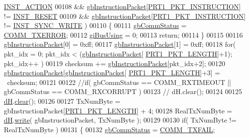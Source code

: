 \begin{DoxyCode}
      \hyperlink{dynamixel_8h_adea21b73305aa7a5b3317e299c616853}{INST\_ACTION}
00108         && \hyperlink{classdynamixel_afd94dcf01b8e96298727776e222de722}{gbInstructionPacket}[\hyperlink{dynamixel_8h_a3da1d083c018994fb0c859f4e06e1f78}{PRT1\_PKT\_INSTRUCTION}] != 
      \hyperlink{dynamixel_8h_ad670526ca941302efb4a0d00e7dd43c0}{INST\_RESET}
00109         && \hyperlink{classdynamixel_afd94dcf01b8e96298727776e222de722}{gbInstructionPacket}[\hyperlink{dynamixel_8h_a3da1d083c018994fb0c859f4e06e1f78}{PRT1\_PKT\_INSTRUCTION}] != 
      \hyperlink{dynamixel_8h_aeaa4b61ee11d45bd1a0cb932d7abaf77}{INST\_SYNC\_WRITE} )
00110     \{
00111         \hyperlink{classdynamixel_a5b603f6bed7ccc595f1f50bd6a6ebbfc}{gbCommStatus} = \hyperlink{dynamixel_8h_a1bd7c7b30db4f56dc80cef65ad38afff}{COMM\_TXERROR};
00112         \hyperlink{classdynamixel_ad10e0e49f5fef04bf789a89c14cc470a}{giBusUsing} = 0;
00113         \textcolor{keywordflow}{return};
00114     \}
00115     
00116     \hyperlink{classdynamixel_afd94dcf01b8e96298727776e222de722}{gbInstructionPacket}[0] = 0xff;
00117     \hyperlink{classdynamixel_afd94dcf01b8e96298727776e222de722}{gbInstructionPacket}[1] = 0xff;
00118     \textcolor{keywordflow}{for}( pkt\_idx = 0; pkt\_idx < (\hyperlink{classdynamixel_afd94dcf01b8e96298727776e222de722}{gbInstructionPacket}[
      \hyperlink{dynamixel_8h_ab24601f91d0364e4b62edad3c2a0a5c4}{PRT1\_PKT\_LENGTH}]+1); pkt\_idx++ )
00119         checksum += \hyperlink{classdynamixel_afd94dcf01b8e96298727776e222de722}{gbInstructionPacket}[pkt\_idx+2];
00120     \hyperlink{classdynamixel_afd94dcf01b8e96298727776e222de722}{gbInstructionPacket}[\hyperlink{classdynamixel_afd94dcf01b8e96298727776e222de722}{gbInstructionPacket}[
      \hyperlink{dynamixel_8h_ab24601f91d0364e4b62edad3c2a0a5c4}{PRT1\_PKT\_LENGTH}]+3] = ~checksum;
00121     
00122     \textcolor{comment}{//if( gbCommStatus == COMM\_RXTIMEOUT || gbCommStatus == COMM\_RXCORRUPT )}
00123     \textcolor{comment}{//  dH.clear();}
00124 
00125     \hyperlink{classdynamixel_ae003cc90ada6d7b70eaa4ea9d42d4deb}{dH}.\hyperlink{classdxl__hal_a004eedde5af69219d7288ec8ea97c89f}{clear}();
00126 
00127     TxNumByte = gbInstructionPacket[\hyperlink{dynamixel_8h_ab24601f91d0364e4b62edad3c2a0a5c4}{PRT1\_PKT\_LENGTH}] + 4;
00128     RealTxNumByte = \hyperlink{classdynamixel_ae003cc90ada6d7b70eaa4ea9d42d4deb}{dH}.\hyperlink{classdxl__hal_a90106970438fb0ab65852730a1c0776a}{write}( gbInstructionPacket, TxNumByte );
00129 
00130     \textcolor{keywordflow}{if}( TxNumByte != RealTxNumByte )
00131     \{
00132         \hyperlink{classdynamixel_a5b603f6bed7ccc595f1f50bd6a6ebbfc}{gbCommStatus} = \hyperlink{dynamixel_8h_af88390c8be18c4079e65fd07b8d553be}{COMM\_TXFAIL};

\end{DoxyCode}
